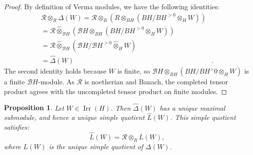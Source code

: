 \documentclass{amsart}
\newtheorem{prop}[defi]{ Proposition}
\begin{document}
\begin{proof}
By definition of Verma modules, we have the following identities:
\begin{align*}
\mathscr{R}\otimes_{R}\Delta(W)=\mathscr{R}\otimes_{R}\left(R\otimes_{BH}\left(BH/BH^{>0}\otimes_{H} W \right)  \right)\\
= \mathscr{R}\widehat{\otimes}_{\mathscr{B}H}\left(\mathscr{B}H\otimes_{BH}\left(BH/BH^{>0}\otimes_{H} W \right)\right)\\
=\mathscr{R}\widehat{\otimes}_{\mathscr{B}H}\left(\mathscr{B}H/\mathscr{B}H^{>0}\widehat{\otimes}_{H} W \right)\\
=\widehat{\Delta}(W)&.
\end{align*}
The second identity holds because $W$ is finite, so $\mathscr{B}H\otimes_{BH}\left(BH/BH^>0\otimes_{H} W \right)$ is a finite $\mathscr{B}H$-module. As $\mathscr{R}$ is  noetherian and Banach, the completed tensor product agrees with the uncompleted tensor product on finite modules.
\end{proof}
\begin{prop}\label{prop simple modules in OX}
Let $W\in \operatorname{Irr}(H)$. Then  $\widehat{\Delta}(W)$ has a unique maximal submodule, and hence a unique simple quotient $\widehat{L}(W)$. This simple quotient satisfies:
\begin{equation*}
    \widehat{L}(W)=\mathscr{R}\otimes_{R}L(W),
\end{equation*}
where $L(W)$ is the unique simple quotient of $\Delta(W)$. 
\end{prop}
\end{document}
